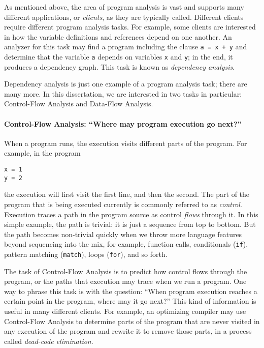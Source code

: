 \documentclass[12pt, oneside]{book}
\begin{document}
As mentioned above, the area of program analysis is vast and supports many different applications, or \emph{clients}, as they are typically called. Different clients require different program analysis tasks. For example, some clients are interested in how the variable definitions and references depend on one another. An analyzer for this task may find a program including the clause \texttt{a = x + y} and determine that the variable \texttt{a} depends on variables \texttt{x} and \texttt{y}; in the end, it produces a dependency graph. This task is known as \emph{dependency analysis}.

Dependency analysis is just one example of a program analysis task; there are many more. In this dissertation, we are interested in two tasks in particular: Control-Flow Analysis and Data-Flow Analysis.

\paragraph{Control-Flow Analysis: “Where may program execution go next?”}

When a program runs, the execution visits different parts of the program. For example, in the program

\begin{Verbatim}
x = 1
y = 2
\end{Verbatim}

\noindent the execution will first visit the first line, and then the second. The part of the program that is being executed currently is commonly referred to as \emph{control}. Execution traces a path in the program source as control \emph{flows} through it. In this simple example, the path is trivial: it is just a sequence from top to bottom. But the path becomes non-trivial quickly when we throw more language features beyond sequencing into the mix, for example, function calls, conditionals (\texttt{if}), pattern matching (\texttt{match}), loops (\texttt{for}), and so forth.

The task of Control-Flow Analysis is to predict how control flows through the program, or the paths that execution may trace when we run a program. One way to phrase this task is with the question: “When program execution reaches a certain point in the program, where may it go next?” This kind of information is useful in many different clients. For example, an optimizing compiler may use Control-Flow Analysis to determine parts of the program that are never visited in any execution of the program and rewrite it to remove those parts, in a process called \emph{dead-code elimination}.
\end{document}
